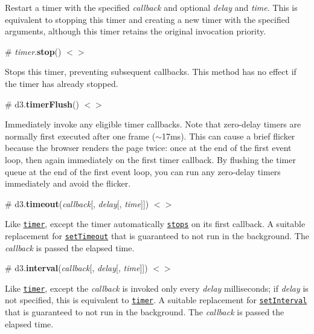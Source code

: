 Restart a timer with the specified {\itshape callback} and optional {\itshape delay} and {\itshape time}. This is equivalent to stopping this timer and creating a new timer with the specified arguments, although this timer retains the original invocation priority.

\label{_timer_stop}%
\# {\itshape timer}.{\bfseries stop}() \href{https://github.com/d3/d3-timer/blob/master/src/timer.js#L43}{\tt $<$$>$}

Stops this timer, preventing subsequent callbacks. This method has no effect if the timer has already stopped.

\label{_timerFlush}%
\# d3.{\bfseries timer\+Flush}() \href{https://github.com/d3/d3-timer/blob/master/src/timer.js#L58}{\tt $<$$>$}

Immediately invoke any eligible timer callbacks. Note that zero-\/delay timers are normally first executed after one frame ($\sim$17ms). This can cause a brief flicker because the browser renders the page twice\+: once at the end of the first event loop, then again immediately on the first timer callback. By flushing the timer queue at the end of the first event loop, you can run any zero-\/delay timers immediately and avoid the flicker.

\label{_timeout}%
\# d3.{\bfseries timeout}({\itshape callback}\mbox{[}, {\itshape delay}\mbox{[}, {\itshape time}\mbox{]}\mbox{]}) \href{https://github.com/d3/d3-timer/blob/master/src/timeout.js}{\tt $<$$>$}

Like \href{#timer}{\tt timer}, except the timer automatically \href{#timer_stop}{\tt stops} on its first callback. A suitable replacement for \href{https://developer.mozilla.org/en-US/docs/Web/API/WindowTimers/setTimeout}{\tt set\+Timeout} that is guaranteed to not run in the background. The {\itshape callback} is passed the elapsed time.

\label{_interval}%
\# d3.{\bfseries interval}({\itshape callback}\mbox{[}, {\itshape delay}\mbox{[}, {\itshape time}\mbox{]}\mbox{]}) \href{https://github.com/d3/d3-timer/blob/master/src/interval.js}{\tt $<$$>$}

Like \href{#timer}{\tt timer}, except the {\itshape callback} is invoked only every {\itshape delay} milliseconds; if {\itshape delay} is not specified, this is equivalent to \href{#timer}{\tt timer}. A suitable replacement for \href{https://developer.mozilla.org/en-US/docs/Web/API/WindowTimers/setInterval}{\tt set\+Interval} that is guaranteed to not run in the background. The {\itshape callback} is passed the elapsed time. 